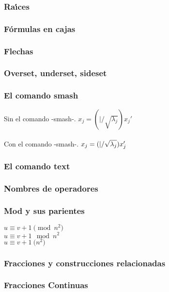 \documentclass [spanish,12pt]{article}
\begin{document}
\subsubsection{Ra\'{\i}ces}

\subsubsection{F\'ormulas en cajas}

\subsubsection{Flechas}

\subsubsection{Overset, underset, sideset}

\subsubsection{El comando smash}
Sin el comando -smash-.
$ x_j = (|/\sqrt{\lambda_j})x_j' $
\\ \\
Con el comando -smash-.
$ x_j = (|/\sqrt{\smash[b]{\lambda_j}})x_j' $


\subsubsection{El comando text}

\subsubsection{Nombres de operadores}

\subsubsection{Mod y sus parientes}
$ u \equiv v+1 \pmod{n^2} $
\\
$ u \equiv v+1 \mod{n^2} $
\\
$ u \equiv v+1 \pod{n^2} $

\subsubsection{Fracciones y construcciones relacionadas}

\subsubsection{Fracciones Continuas}
\end{document}
